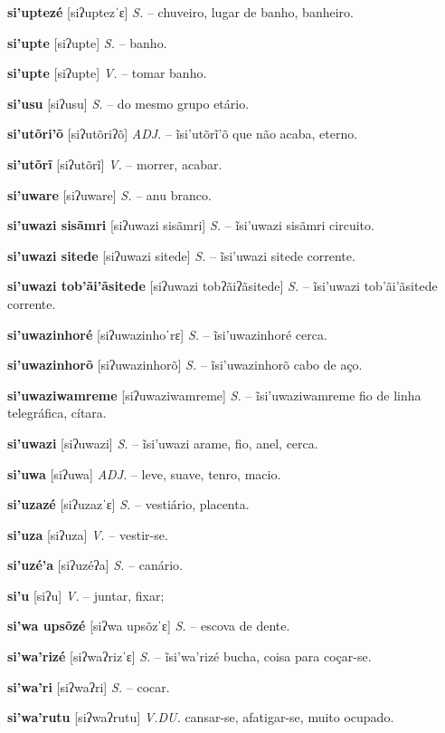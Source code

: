 \textbf{si'uptezé} [siʔuptezˈɛ] \textit{S.} -- chuveiro, lugar de banho, banheiro.

\textbf{si'upte} [siʔupte] \textit{S.} -- banho.

\textbf{si'upte} [siʔupte] \textit{V.} -- tomar banho.

\textbf{si'usu} [siʔusu] \textit{S.} -- do mesmo grupo etário.

\textbf{si'utõri'õ} [siʔutõriʔõ] \textit{ADJ.} -- ĩsi'utõrĩ'õ que não acaba, eterno.

\textbf{si'utõrĩ} [siʔutõrĩ] \textit{V.} -- morrer, acabar.

\textbf{si'uware} [siʔuware] \textit{S.} -- anu branco.

\textbf{si'uwazi sisãmri} [siʔuwazi sisãmri] \textit{S.} -- ĩsi'uwazi sisãmri circuito.

\textbf{si'uwazi sitede} [siʔuwazi sitede] \textit{S.} -- ĩsi'uwazi sitede corrente.

\textbf{si'uwazi tob'ãi'ãsitede} [siʔuwazi tobʔãiʔãsitede] \textit{S.} -- ĩsi'uwazi tob'ãi'ãsitede corrente.

\textbf{si'uwazinhoré} [siʔuwazinhoˈrɛ] \textit{S.} -- ĩsi'uwazinhoré cerca.

\textbf{si'uwazinhorõ} [siʔuwazinhorõ] \textit{S.} -- ĩsi'uwazinhorõ cabo de aço.

\textbf{si'uwaziwamreme} [siʔuwaziwamreme] \textit{S.} -- ĩsi'uwaziwamreme fio de linha telegráfica, cítara.

\textbf{si'uwazi} [siʔuwazi] \textit{S.} -- ĩsi'uwazi arame, fio, anel, cerca.

\textbf{si'uwa} [siʔuwa] \textit{ADJ.} -- leve, suave, tenro, macio.

\textbf{si'uzazé} [siʔuzazˈɛ] \textit{S.} -- vestiário, placenta.

\textbf{si'uza} [siʔuza] \textit{V.} -- vestir-se.

\textbf{si'uzé'a} [siʔuzéʔa] \textit{S.} -- canário.

\textbf{si'u} [siʔu] \textit{V.} -- juntar, fixar;

\textbf{si'wa upsõzé} [siʔwa upsõzˈɛ] \textit{S.} -- escova de dente.

\textbf{si'wa'rizé} [siʔwaʔrizˈɛ] \textit{S.} -- ĩsi'wa'rizé bucha, coisa para coçar-se.

\textbf{si'wa'ri} [siʔwaʔri] \textit{S.} -- cocar.

\textbf{si'wa'rutu} [siʔwaʔrutu] \textit{V.DU.} cansar-se, afatigar-se, muito ocupado.

